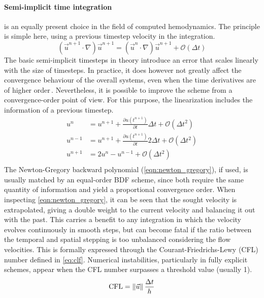 \paragraph{Semi-implicit time integration} is an equally present choice in the field of computed hemodynamics. The principle is simple here, using a previous timestep velocity in the integration.
\begin{equation*}
	(\vec{u}^{n+1}\cdot\nabla)\vec{u}^{n+1} = (\vec{u}^{n}\cdot\nabla)\vec{u}^{n+1} + \mathcal{O}(\Delta t)
\end{equation*}
The basic semi-implicit timesteps in theory introduce an error that scales linearly with the size of timesteps. In practice, it does however not greatly affect the convergence behaviour of the overall systems, even when the time derivatives are of higher order\,\cite{Valen-Sendstad2014}. Nevertheless, it is possible to improve the scheme from a convergence-order point of view. For this purpose, the linearization includes the information of a previous timestep.
\begin{equation}
	\begin{split}
		u^{n} &= u^{n+1} + \frac{\partial u(t^{n+1})}{\partial t}\Delta t + \mathcal{O}(\Delta t^2)\\
		u^{n-1} &= u^{n+1} + \frac{\partial u(t^{n+1})}{\partial t}2\Delta t + \mathcal{O}(\Delta t^2)\\
		u^{n+1} &= 2 u^{n} - u^{n-1} + \mathcal{O}(\Delta t^2)\\
	\end{split}
	\label{eqn:newton_gregory}
\end{equation}
The Newton-Gregory backward polynomial (\autoref{eqn:newton_gregory}), if used, is usually matched by an equal-order BDF scheme, since both require the same quantity of information and yield a proportional convergence order. When inspecting \autoref{eqn:newton_gregory}, it can be seen that the sought velocity is extrapolated, giving a double weight to the current velocity and balancing it out with the past. This carries a benefit to any integration in which the velocity evolves continuously in smooth steps, but can become fatal if the ratio between the temporal and spatial stepping is too unbalanced considering the flow velocities. This is formally expressed through the Courant-Friedrichs-Lewy (CFL) number defined in \autoref{eq:clf}. Numerical instabilities, particularly in fully explicit schemes, appear when the CFL number surpasses a threshold value (usually 1).
\begin{equation}
	\text{CFL} = \left\lVert\vec{u}\right\rVert \frac{\Delta t}{h}
	\label{eq:clf}
\end{equation}

